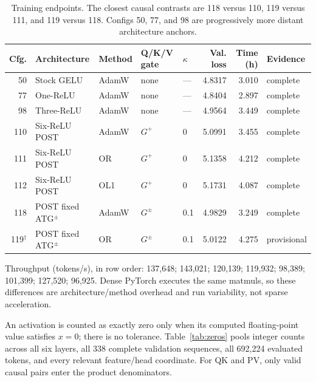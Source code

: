 \documentclass[10pt]{article}
\begin{document}
\begin{table}[H]
\centering
\caption{Training endpoints. The closest causal contrasts are 118 versus 110, 119 versus 111, and 119 versus 118. Configs 50, 77, and 98 are progressively more distant architecture anchors.}
\label{tab:endpoints}
\scriptsize
\setlength{\tabcolsep}{3.8pt}
\begin{tabularx}{\textwidth}{rXlllrrl}
\toprule
Cfg. & Architecture & Method & Q/K/V gate & $\kappa$ & Val. loss & Time (h) & Evidence \\
\midrule
50  & Stock GELU & AdamW & none & --- & 4.8317 & 3.010 & complete \\
77  & One-ReLU & AdamW & none & --- & 4.8404 & 2.897 & complete \\
98  & Three-ReLU & AdamW & none & --- & 4.9564 & 3.449 & complete \\
110 & Six-ReLU POST & AdamW & $G^+$ & 0 & 5.0991 & 3.455 & complete \\
111 & Six-ReLU POST & OR & $G^+$ & 0 & 5.1358 & 4.212 & complete \\
112 & Six-ReLU POST & OL1 & $G^+$ & 0 & 5.1731 & 4.087 & complete \\
118 & POST fixed ATG$^{\pm}$ & AdamW & $G^{\pm}$ & 0.1 & 4.9829 & 3.249 & complete \\
119$^{\dagger}$ & POST fixed ATG$^{\pm}$ & OR & $G^{\pm}$ & 0.1 & 5.0122 & 4.275 & provisional \\
\bottomrule
\end{tabularx}
\vspace{0.25em}

\scriptsize Throughput (tokens/s), in row order: 137,648; 143,021; 120,139; 119,932; 98,389; 101,399; 127,520; 96,925. Dense PyTorch executes the same matmuls, so these differences are architecture/method overhead and run variability, not sparse acceleration.
\end{table}

An activation is counted as exactly zero only when its computed floating-point value satisfies $x=0$; there is no tolerance. Table~\ref{tab:zeros} pools integer counts across all six layers, all 338 complete validation sequences, all 692,224 evaluated tokens, and every relevant feature/head coordinate. For QK and PV, only valid causal pairs enter the product denominators.
\end{document}
